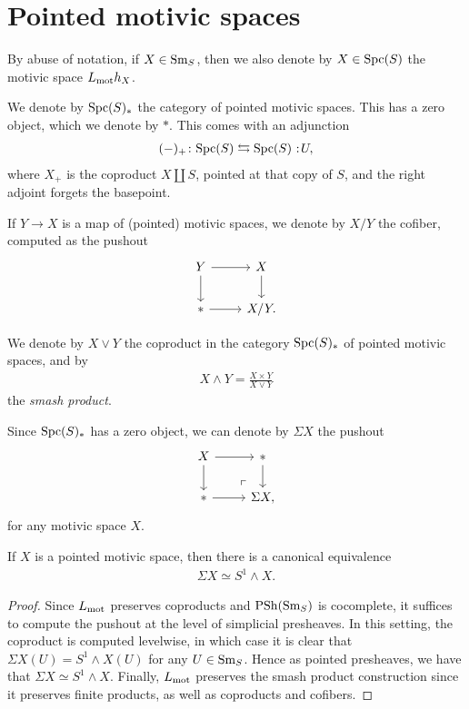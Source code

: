 \documentclass[11pt]{amsart}
\let\smashprod\wedge
\begin{document}
\section{Pointed motivic spaces}

\begin{notation} By abuse of notation, if $X \in \mathrm{Sm}_S$, then we also denote by $X \in \mathrm{Spc}(S)$ the motivic space $L_{\mathrm{mot}} h_X$.
\end{notation}

\begin{notation} We denote by $\mathrm{Spc}(S)_\ast$ the category of pointed motivic spaces. This has a zero object, which we denote by $\ast$. This comes with an adjunction
\begin{align*}
    (-)_+ \colon \Spc(S) \leftrightarrows \Spc(S) \noloc U,
\end{align*}
where $X_+$ is the coproduct $X \amalg S$, pointed at that copy of $S$, and the right adjoint forgets the basepoint.
\end{notation}

\begin{notation} If $Y \to X$ is a map of (pointed) motivic spaces, we denote by $X/Y$ the cofiber, computed as the pushout
\[\begin{tikzcd}
    Y\rar\dar & X\dar\\
    \ast\rar & X/Y.
\end{tikzcd} \]
\end{notation}

We denote by $X \vee Y$ the coproduct in the category $\mathrm{Spc}(S)_\ast$ of pointed motivic spaces, and by
\begin{align*}
    X \smashprod Y = \frac{X \times Y}{X \vee Y}
\end{align*}
the \textit{smash product}.

\begin{notation} Since $\mathrm{Spc}(S)_\ast$ has a zero object, we can denote by $\Sigma X$ the pushout
\[\begin{tikzcd}
    X\rar\dar & \ast\dar\\
    \ast\rar & \Sigma X\po,
\end{tikzcd} \]
for any motivic space $X$.
\end{notation}

\begin{proposition} If $X$ is a pointed motivic space, then there is a canonical equivalence
\begin{align*}
    \Sigma X \simeq S^1 \smashprod X.
\end{align*}
\end{proposition}
\begin{proof} Since $L_{\mathrm{mot}}$ preserves coproducts and $\mathrm{PSh}(\mathrm{Sm}_S)$ is cocomplete, it suffices to compute the pushout at the level of simplicial presheaves. In this setting, the coproduct is computed levelwise, in which case it is clear that $\Sigma X(U) = S^1 \smashprod X(U)$ for any $U \in \mathrm{Sm}_S$. Hence as pointed presheaves, we have that $\Sigma X \simeq S^1 \smashprod  X$. Finally, $L_{\mathrm{mot}}$ preserves the smash product construction since it preserves finite products, as well as coproducts and cofibers.
\end{proof}
%
\end{document}
